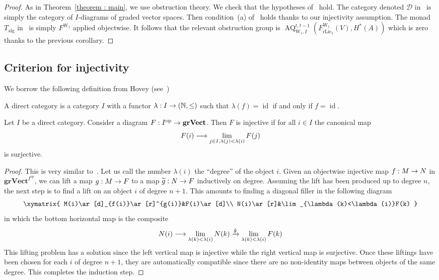 \documentclass[AHL,Unicode,longabstracts,published]{cedram}
\DeclareMathOperator{\opp}{op}
\DeclareMathOperator{\aalg}{alg}
\DeclareMathOperator{\id}{id}
\DeclareMathOperator{\AQ}{AQ}
\DeclareMathOperator{\rlie}{rLie}
\newcommand{\grVect}{\mathbf{grVect}}
\newcommand{\W}{\mathrm{W}}
\newcommand{\clD}{\mathcal{D}}
\newcommand{\bbN}{\mathbb{N}}
\renewcommand*{\to}{\mathchoice{\longrightarrow}{\rightarrow}{\rightarrow}{\rightarrow}}
\let\oldtilde\tilde
\renewcommand*{\tilde}[1]{\mathchoice{\widetilde{#1}}{\widetilde{#1}}{\oldtilde{#1}}{\oldtilde{#1}}}
\begin{document}
\begin{proof}
As in Theorem~\ref{theorem : main}, we use obstruction theory. We check that the hypotheses of~\cite[Theorem~B]{johnsonnoel} hold. The category denoted $\clD$ in~\cite[Theorem~B]{johnsonnoel} is simply the category of $I$-diagrams of graded vector spaces. Then condition~(a) of~\cite[Theorem~B]{johnsonnoel} holds thanks to our injectivity assumption. The monad $T_{\aalg}$ in~\cite[Theorem~B]{johnsonnoel} is simply $F^{\W_1}$ applied objectwise. It follows that the relevant obstruction group is $\AQ_{\W_1,I}^{t,t-1}(F_{\rlie_1}^{\W_1}(V),H^*(A))$ which is zero thanks to the previous corollary.
\end{proof}


\subsection{Criterion for injectivity}

We borrow the following definition from Hovey (see~\cite[Definition~5.1.1]{hoveymodelcategories})

\begin{defi}
A direct category is a category $I$ with a functor $\lambda: I\to(\bbN,\leq)$ such that $\lambda(f)=\id$ if and only if $f=\id$.
\end{defi}

\begin{prop}
Let $I$ be a direct category. Consider a diagram $F: I^{\opp}\to\grVect$. Then $F$ is injective if for all $i\in I$ the canonical map
\[
F(i)\to\lim_{j\in I,\lambda(j)<\lambda(i)} F(j)
\]
is surjective.
\end{prop}

\begin{proof}
This is very similar to~\cite[Proposition~5.1.4]{hoveymodelcategories}. Let us call the number $\lambda(i)$ the ``degree'' of the object $i$. Given an objectwise injective map $f: M\to N$ in $\grVect^{I^{\opp}}$, we can lift a map $g: M\to F$ to a map $\tilde{g}: N\to F$ inductively on degree. Assuming the lift has been produced up to degree $n$, the next step is to find a lift on an object $i$ of degree $n+1$. This amounts to finding a diagonal filler in the following diagram
\[
\xymatrix{ M(i)\ar[d]_{f(i)}\ar[r]^{g(i)}&F(i)\ar[d]\\
N(i)\ar[r]&\lim_{\lambda(k)<\lambda(i)}F(k) }
\]
in which the bottom horizontal map is the composite
\[
N(i)\to \lim_{\lambda(k)<\lambda(i)}N(k)\xrightarrow{\tilde{g}} \lim_{\lambda(k)<\lambda(i)}F(k)
\]
This lifting problem has a solution since the left vertical map is injective while the right vertical map is surjective. Once these liftings have been chosen for each $i$ of degree $n+1$, they are automatically compatible since there are no non-identity maps between objects of the same degree. This completes the induction step.
\end{proof}
\end{document}
